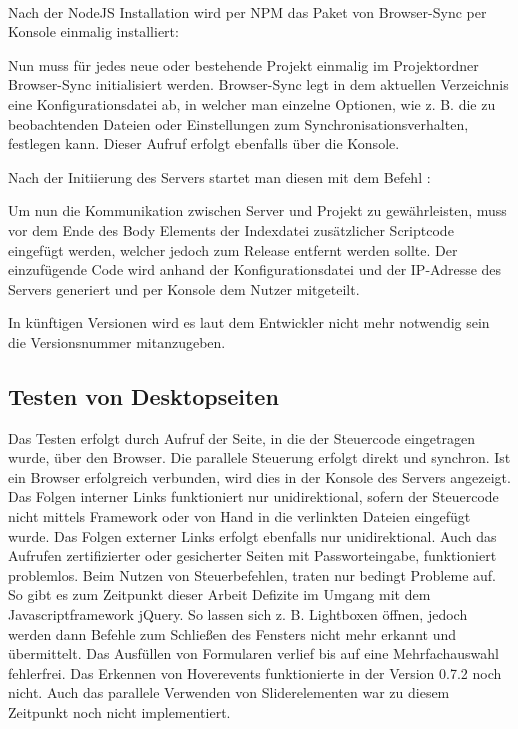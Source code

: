	\\Nach der \gls{NodeJS} Installation wird per \Gls{NPM} das Paket von Browser-Sync per Konsole einmalig installiert:
	
	Nun muss für jedes neue oder bestehende Projekt einmalig im Projektordner Browser-Sync initialisiert werden. Browser-Sync legt in dem aktuellen Verzeichnis eine Konfigurationsdatei ab, in welcher man einzelne Optionen, wie z. B. die zu beobachtenden Dateien oder Einstellungen zum Synchronisationsverhalten, festlegen kann. Dieser Aufruf erfolgt ebenfalls über die Konsole.
	
	Nach der Initiierung des Servers startet man diesen mit dem Befehl :
	
	Um nun die Kommunikation zwischen Server und Projekt zu gewährleisten, muss vor dem Ende des Body Elements der Indexdatei zusätzlicher Scriptcode eingefügt werden, welcher jedoch zum Release entfernt werden sollte. Der einzufügende Code  wird anhand der Konfigurationsdatei und der IP-Adresse des Servers generiert und per Konsole dem Nutzer mitgeteilt.
	
	In künftigen Versionen wird es laut dem Entwickler nicht mehr notwendig sein die Versionsnummer mitanzugeben.
	
	\subsection{Testen von Desktopseiten}
	Das Testen erfolgt durch Aufruf der Seite, in die der Steuercode eingetragen wurde, über den Browser. Die parallele Steuerung erfolgt direkt und synchron. Ist ein Browser erfolgreich verbunden, wird dies in der Konsole des Servers angezeigt.
	Das Folgen interner Links funktioniert nur unidirektional, sofern der Steuercode nicht mittels \Gls{Framework} oder von Hand in die verlinkten Dateien eingefügt wurde. Das Folgen externer Links erfolgt ebenfalls nur unidirektional. Auch das Aufrufen zertifizierter oder \gls{gesichert}er Seiten mit Passworteingabe, funktioniert problemlos. Beim Nutzen von Steuerbefehlen, traten nur bedingt Probleme auf. So gibt es zum Zeitpunkt dieser Arbeit Defizite im Umgang mit dem \Gls{Javascript}framework jQuery. So lassen sich z. B. Lightboxen öffnen, jedoch werden dann Befehle zum \mbox{Schließen} des Fensters nicht mehr erkannt und übermittelt. Das Ausfüllen von Formularen verlief bis auf eine Mehrfachauswahl fehlerfrei. Das Erkennen von Hoverevents funktionierte in der Version 0.7.2 noch nicht. Auch das parallele Verwenden von Sliderelementen war zu diesem Zeitpunkt noch nicht implementiert.
	
